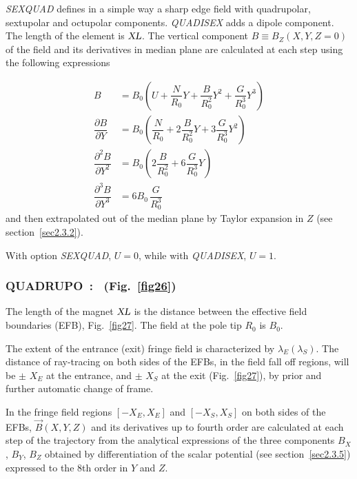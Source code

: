 \textsl{SEXQUAD}    defines in a simple way a sharp edge field with quadrupolar, 
sextupolar and octupolar components. \textsl{QUADISEX}  adds a dipole component. The length of 
the element is $ \textsl{XL} $.  The vertical component $ B \equiv B_Z(X,Y,Z=0) $ of the field and its derivatives in median plane are 
calculated at each step using the following expressions 

\begin{align*}
	B &   =     B_0
	           \left(U+ \dfrac{N }{ R_0}Y + 
	                \dfrac{B }{ R^2_0} Y^2+ \dfrac{G }{ R^3_0} Y^3 \right)  \\
	\dfrac{ \partial B }{ \partial Y} 
	   &   =   B_0 \left(
	             \dfrac{N }{ R_0} + 2 \dfrac{B }{ R^2_0} Y + 3\dfrac{G }{ R^3_0}Y^2 \right) \\  
	\dfrac{ \partial^ 2B }{ \partial Y^2} 
	  &  =     B_0 \left(2 \dfrac{B }{ R^2_0} + 6\dfrac{G }{ R^3_0} Y \right) \\
	\dfrac{ \partial^ 3B }{ \partial Y^3}  
	   & =     6B_0 \,  \dfrac{G }{ R^3_0}
\end{align*}  
    and then extrapolated out of the median plane by Taylor expansion in $ Z $ 
(see section~\ref{sec2.3.2}).
\medskip

\noindent With option \textsl{SEXQUAD}, $ U=0$,  while with \textsl{QUADISEX}, $U=1 $. 

\newpage

\subsubsection*{QUADRUPO~:  \QUADRUPOTitl\  (Fig.~\protect\ref{fig26}) } \label{QUADRUPO} 
\medskip

The length of the magnet $ \textsl{XL} $ is the distance between the
effective field boundaries (EFB), Fig.~\ref{fig27}. The field at the pole tip $ R_0 $ is $ B_0 $. 

\noindent The extent of the  entrance (exit) fringe field is characterized by 
$ \lambda_ E(\lambda_ S) $.  The distance of ray-tracing on both sides of the
EFBs, in the field fall off regions, will be $\pm$  $ X_E $ at 
the entrance, and $\pm$  $ X_S $ at the exit (Fig.~\ref{fig27}),  
by prior and further automatic change of frame. 

\noindent In the fringe field  regions $[ -X_E,X_E ]$  and 
$[ -X_S,X_S ]$ on both sides of the EFBs, $ \vec  B(X,Y,Z) $ and its derivatives up to
fourth order are calculated at each step of the trajectory from the analytical expressions 
of the three components $ B_X $, $ B_Y $, $ B_Z $ obtained by differentiation
of the scalar potential (see section~\ref{sec2.3.5}) expressed to the 8th order in $ Y $ 
and $ Z $. 

